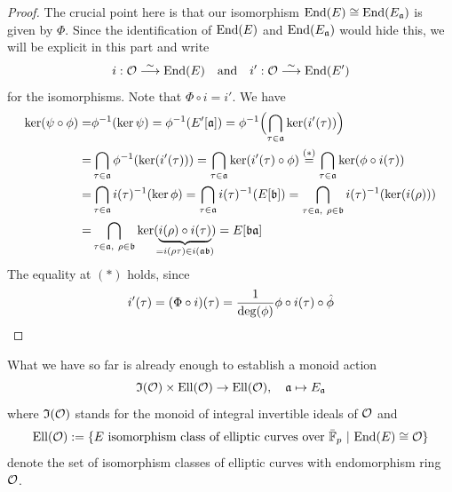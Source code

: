 \begin{proof}
    The crucial point here is that our isomorphism $\mathrm{End}(E) \cong \mathrm{End}(E_{\mathfrak{a}})$ is given by $\Phi$.
    Since the identification of $\mathrm{End}(E)$ and $\mathrm{End}(E_{\mathfrak{a}})$ would hide this, we will be explicit in this part and write
    \begin{align*}
        i: \mathcal{O} \overset{\sim}{\longrightarrow} \mathrm{End}(E) \quad \text{and} \quad i': \mathcal{O} \overset{\sim}{\longrightarrow} \mathrm{End}(E')
    \end{align*}
    for the isomorphisms.
    Note that $\Phi \circ i = i'$.
    We have
    \begin{align*}
        \ker(\psi \circ \phi) =& \phi^{-1}(\ker\psi) = \phi^{-1}(E'[\mathfrak{a}]) = \phi^{-1}\Bigl( \bigcap_{\tau \in \mathfrak{a}} \ker(i'(\tau)) \Bigr) \\
        =& \bigcap_{\tau \in \mathfrak{a}} \phi^{-1}(\ker(i'(\tau))) = \bigcap_{\tau \in \mathfrak{a}} \ker(i'(\tau) \circ \phi) \overset{(*)}{=} \bigcap_{\tau \in \mathfrak{a}} \ker(\phi \circ i(\tau)) \\
        =& \bigcap_{\tau \in \mathfrak{a}} i(\tau)^{-1}(\ker\phi) = \bigcap_{\tau \in \mathfrak{a}} i(\tau)^{-1}(E[\mathfrak{b}]) = \bigcap_{\tau \in \mathfrak{a}, \ \rho \in \mathfrak{b}} i(\tau)^{-1}(\ker(i(\rho))) \\
        =& \bigcap_{\tau \in \mathfrak{a}, \ \rho \in \mathfrak{b}} \ker(\underbrace{i(\rho) \circ i(\tau)}_{\mathclap{= i(\rho\tau) \in i(\a\b)}}) = E[\mathfrak{b}\mathfrak{a}]
    \end{align*}
    The equality at $(*)$ holds, since
    \begin{equation*}
        i'(\tau) = (\Phi \circ i)(\tau) = \frac 1 {\deg(\phi)} \phi \circ i(\tau) \circ \hat{\phi} \qedhere
    \end{equation*}
\end{proof}
What we have so far is already enough to establish a monoid action
\begin{equation*}
    \mathfrak{I}(\mathcal{O}) \times \mathrm{Ell}(\mathcal{O}) \to \mathrm{Ell}(\mathcal{O}), \quad \mathfrak{a} \mapsto E_{\mathfrak{a}}
\end{equation*}
where $\mathfrak{I}(\mathcal{O})$ stands for the monoid of integral invertible ideals of $\mathcal{O}$ and
\begin{equation*}
    \mathrm{Ell}(\mathcal{O}) := \{ \text{$E$ isomorphism class of elliptic curves over $\bar{\mathbb{F}}_p$} \ | \ \mathrm{End}(E) \cong \mathcal{O} \}
\end{equation*}
denote the set of isomorphism classes of elliptic curves with endomorphism ring $\mathcal{O}$.

